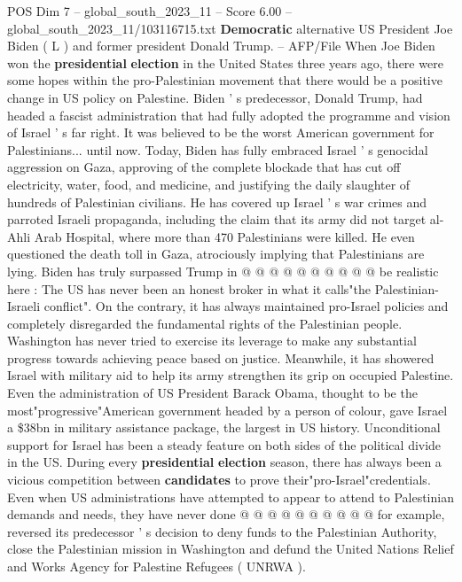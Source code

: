 \begin{textsample}{POS Dim 7 – global\_south\_2023\_11 – Score 6.00 – global\_south\_2023\_11/103116715.txt}  \label{ex:f7_pos_303}
\textbf{Democratic} alternative US President Joe Biden ( L ) and former president Donald Trump. -- AFP/File When Joe Biden won the \textbf{presidential} \textbf{election} in the United States three years ago, there were some hopes within the pro-Palestinian movement that there would be a positive change in US policy on Palestine.
Biden ' s predecessor, Donald Trump, had headed a fascist administration that had fully adopted the programme and vision of Israel ' s far right.
It was believed to be the worst American government for Palestinians... until now.
Today, Biden has fully embraced Israel ' s genocidal aggression on Gaza, approving of the complete blockade that has cut off electricity, water, food, and medicine, and justifying the daily slaughter of hundreds of Palestinian civilians.
He has covered up Israel ' s war crimes and parroted Israeli propaganda, including the claim that its army did not target al-Ahli Arab Hospital, where more than 470 Palestinians were killed.
He even questioned the death toll in Gaza, atrociously implying that Palestinians are lying.
Biden has truly surpassed Trump in @ @ @ @ @ @ @ @ @ @ be realistic here : The US has never been an honest broker in what it calls"the Palestinian-Israeli conflict".
On the contrary, it has always maintained pro-Israel policies and completely disregarded the fundamental rights of the Palestinian people.
Washington has never tried to exercise its leverage to make any substantial progress towards achieving peace based on justice.
Meanwhile, it has showered Israel with military aid to help its army strengthen its grip on occupied Palestine.
Even the administration of US President Barack Obama, thought to be the most"progressive"American government headed by a person of colour, gave Israel a \$38bn in military assistance package, the largest in US history.
Unconditional support for Israel has been a steady feature on both sides of the political divide in the US.
During every \textbf{presidential} \textbf{election} season, there has always been a vicious competition between \textbf{candidates} to prove their"pro-Israel"credentials.
Even when US administrations have attempted to appear to attend to Palestinian demands and needs, they have never done @ @ @ @ @ @ @ @ @ @ for example, reversed its predecessor ' s decision to deny funds to the Palestinian Authority, close the Palestinian mission in Washington and defund the United Nations Relief and Works Agency for Palestine Refugees ( UNRWA ).

\end{textsample}
